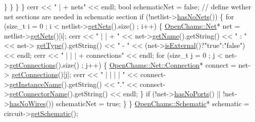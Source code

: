 \begin{DoxyCodeInclude}
                \}
            \}
        \}
    \}
    cerr << \textcolor{stringliteral}{" | + nets"} << endl;
    \textcolor{keywordtype}{bool} schematicNet = \textcolor{keyword}{false}; \textcolor{comment}{// define wether net sections are needed in schematic section}
    \textcolor{keywordflow}{if} (!netlist->\mbox{\hyperlink{class_open_chams_1_1_netlist_a36089e1b3a3f2d3f7c9dcc8e3c3bd6d8}{hasNoNets}}()) \{
        \textcolor{keywordflow}{for} (\textcolor{keywordtype}{size\_t} i = 0 ; i < netlist->\mbox{\hyperlink{class_open_chams_1_1_netlist_abf36db82efb99a8ec8ae4b454be00019}{getNets}}().size() ; i++) \{
            \mbox{\hyperlink{class_open_chams_1_1_net}{OpenChams::Net}}* net = netlist->\mbox{\hyperlink{class_open_chams_1_1_netlist_abf36db82efb99a8ec8ae4b454be00019}{getNets}}()[i];
            cerr << \textcolor{stringliteral}{" | | + "} << net->\mbox{\hyperlink{class_open_chams_1_1_net_a3fd7335faa33dce2f87c7e50eef3e294}{getName}}().getString() << \textcolor{stringliteral}{" : "} << net->
      \mbox{\hyperlink{class_open_chams_1_1_net_a7a88ff26f0ba9cfbfa5059c565d1e30b}{getType}}().getString() << \textcolor{stringliteral}{" - "} << (net->\mbox{\hyperlink{class_open_chams_1_1_net_ab2570574db49633f58f7b64099d6852c}{isExternal}}()?\textcolor{stringliteral}{"true"}:\textcolor{stringliteral}{"false"}) << endl;
            cerr << \textcolor{stringliteral}{" | | | + connections"} << endl;
            \textcolor{keywordflow}{for} (\textcolor{keywordtype}{size\_t} j = 0 ; j < net->\mbox{\hyperlink{class_open_chams_1_1_net_a87e7c71b25171dd479af0488865c8179}{getConnections}}().size() ; j++) \{
                \mbox{\hyperlink{class_open_chams_1_1_net_1_1_connection}{OpenChams::Net::Connection}}* connect = net->
      \mbox{\hyperlink{class_open_chams_1_1_net_a87e7c71b25171dd479af0488865c8179}{getConnections}}()[j];
                cerr << \textcolor{stringliteral}{" | | | | "} << connect->\mbox{\hyperlink{class_open_chams_1_1_net_1_1_connection_a7d21af8ef567328876b39f135d6c94ca}{getInstanceName}}().getString() << \textcolor{stringliteral}{"."} << 
      connect->\mbox{\hyperlink{class_open_chams_1_1_net_1_1_connection_a33e7a2599cd477f8190c85d2aba9ce88}{getConnectorName}}().getString() << endl;
            \}
            \textcolor{keywordflow}{if} (!net->\mbox{\hyperlink{class_open_chams_1_1_net_a3eef7a6d1e945441f197f0918ab8895e}{hasNoPorts}}() || !net->\mbox{\hyperlink{class_open_chams_1_1_net_ac9470e72b26d4cddef3d13e69057ee54}{hasNoWires}}())
                schematicNet = \textcolor{keyword}{true};
        \}
    \}
    \mbox{\hyperlink{class_open_chams_1_1_schematic}{OpenChams::Schematic}}* schematic = circuit->\mbox{\hyperlink{class_open_chams_1_1_circuit_af6f967a5685ac92fe760f4eb95c8c51f}{getSchematic}}();

\end{DoxyCodeInclude}
